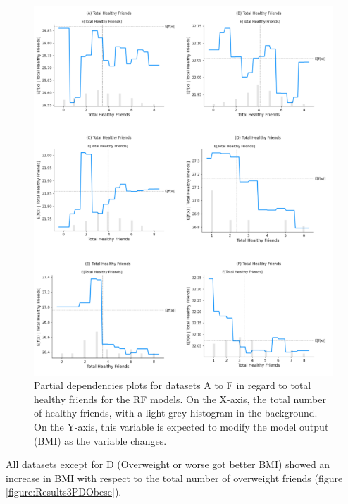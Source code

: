     \begin{figure}[ht]
        \centering
            \includegraphics[width=0.9\linewidth]{figures/Results/ResultThree/PDHealthy.png } 
        \caption{Partial dependencies plots for datasets A to F in regard to total healthy friends for the RF models. On the X-axis, the total number of healthy friends, with a light grey histogram in the background. On the Y-axis, this variable is expected to modify the model output (BMI) as the variable changes.}
        \label{figure:Results3PDHealthy}
    \end{figure}

All datasets except for D (Overweight or worse got better BMI) showed an increase in BMI with respect to the total number of overweight friends (figure \ref{figure:Results3PDObese}). 


